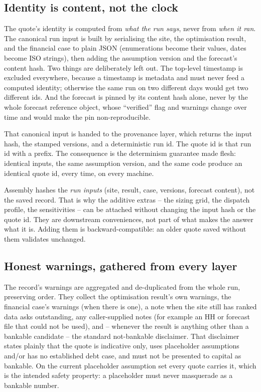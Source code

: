 \subsection{Identity is content, not the clock}

The quote's identity is computed from \emph{what the run says}, never from \emph{when it ran}. The canonical run input is built by serialising the site, the optimisation result, and the financial case to plain JSON (enumerations become their values, dates become ISO strings), then adding the assumption version and the forecast's content hash. Two things are deliberately left out. The top-level  timestamp is excluded everywhere, because a timestamp is metadata and must never feed a computed identity; otherwise the same run on two different days would get two different ids. And the forecast is pinned by its content hash alone, never by the whole forecast reference object, whose ``verified'' flag and warnings change over time and would make the pin non-reproducible.

That canonical input is handed to the provenance layer, which returns the input hash, the stamped versions, and a deterministic run id. The quote id is that run id with a  prefix. The consequence is the determinism guarantee made flesh: identical inputs, the same assumption version, and the same code produce an identical quote id, every time, on every machine.

\begin{keyidea}
Assembly hashes the \emph{run inputs} (site, result, case, versions, forecast content), not the saved record. That is why the additive extras -- the sizing grid, the dispatch profile, the sensitivities -- can be attached without changing the input hash or the quote id. They are downstream conveniences, not part of what makes the answer what it is. Adding them is backward-compatible: an older quote saved without them validates unchanged.
\end{keyidea}

\subsection{Honest warnings, gathered from every layer}

The record's warnings are aggregated and de-duplicated from the whole run, preserving order. They collect the optimisation result's own warnings, the financial case's warnings (when there is one), a note when the site still has ranked data asks outstanding, any caller-supplied notes (for example an HH or forecast file that could not be used), and -- whenever the result is anything other than a bankable candidate -- the standard not-bankable disclaimer. That disclaimer states plainly that the quote is indicative only, uses placeholder assumptions and/or has no established debt case, and must not be presented to capital as bankable. On the current placeholder assumption set every quote carries it, which is the intended safety property: a placeholder must never masquerade as a bankable number.


